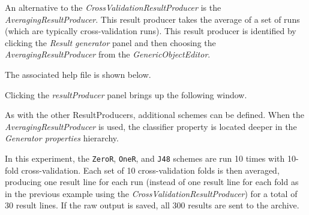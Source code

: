 An alternative to the \textit{CrossValidationResultProducer} is the \textit{AveragingResultProducer}. This result producer takes the average of a set of runs (which are typically cross-validation runs). This result producer is identified by clicking the \textit{Result generator} panel and then choosing the \textit{AveragingResultProducer} from the \textit{GenericObjectEditor}.
\begin{center}
\end{center}

The associated help file is shown below.
\begin{center}
\end{center}

Clicking the \textit{resultProducer} panel brings up the following window.
\begin{center}
\end{center}

As with the other ResultProducers, additional schemes can be defined. When the \textit{AveragingResultProducer} is used, the classifier property is located deeper in the \textit{Generator properties} hierarchy.
\begin{center}
\end{center}
	
\begin{center}
\end{center}

In this experiment, the \texttt{ZeroR}, \texttt{OneR}, and \texttt{J48} schemes are run 10 times with 10-fold cross-validation. Each set of 10 cross-validation folds is then averaged, producing one result line for each run (instead of one result line for each fold as in the previous example using the \textit{CrossValidationResultProducer}) for a total of 30 result lines. If the raw output is saved, all 300 results are sent to the archive.
\begin{center}
\end{center}



